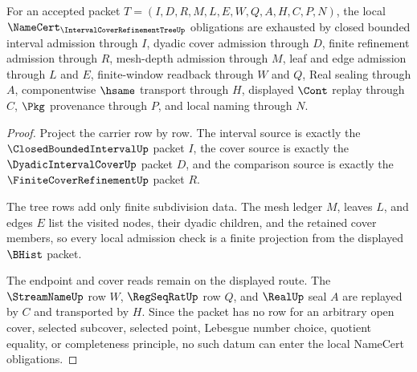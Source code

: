 
\begin{theorem}
\label{thm:interval-cover-refinement-tree-namecert-obligations}
For an accepted packet $T=(I,D,R,M,L,E,W,Q,A,H,C,P,N)$, the local $\NameCert_{\IntervalCoverRefinementTreeUp}$ obligations are exhausted by closed bounded interval admission through $I$, dyadic cover admission through $D$, finite refinement admission through $R$, mesh-depth admission through $M$, leaf and edge admission through $L$ and $E$, finite-window readback through $W$ and $Q$, Real sealing through $A$, componentwise $\hsame$ transport through $H$, displayed $\Cont$ replay through $C$, $\Pkg$ provenance through $P$, and local naming through $N$.
\end{theorem}
\begin{proof}
Project the carrier row by row. The interval source is exactly the $\ClosedBoundedIntervalUp$ packet $I$, the cover source is exactly the $\DyadicIntervalCoverUp$ packet $D$, and the comparison source is exactly the $\FiniteCoverRefinementUp$ packet $R$.

The tree rows add only finite subdivision data. The mesh ledger $M$, leaves $L$, and edges $E$ list the visited nodes, their dyadic children, and the retained cover members, so every local admission check is a finite projection from the displayed $\BHist$ packet.

The endpoint and cover reads remain on the displayed route. The $\StreamNameUp$ row $W$, $\RegSeqRatUp$ row $Q$, and $\RealUp$ seal $A$ are replayed by $C$ and transported by $H$. Since the packet has no row for an arbitrary open cover, selected subcover, selected point, Lebesgue number choice, quotient equality, or completeness principle, no such datum can enter the local NameCert obligations.
\end{proof}

